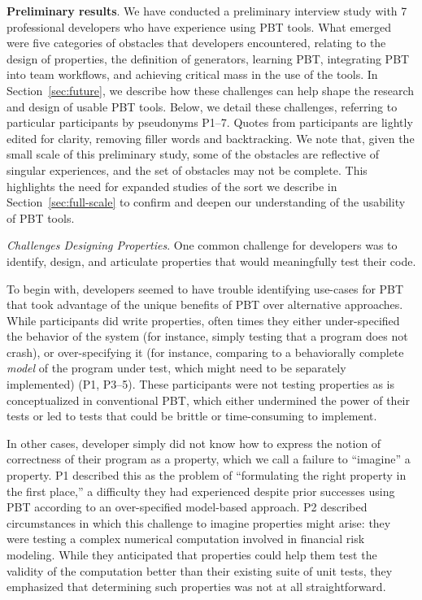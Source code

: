 \textbf{Preliminary results}.
We have conducted a preliminary interview study with 7 professional developers
who have experience using PBT tools.
What emerged were five categories of obstacles that developers encountered,
relating
to the design of properties, the definition of generators, learning PBT,
integrating PBT into team workflows, and achieving critical mass in the use of the tools.
In Section~\ref{sec:future}, we describe how these challenges
can help shape the research and design of usable PBT tools.
Below, we detail these challenges, referring to particular participants by
pseudonyms P1--7. Quotes from participants are lightly edited for clarity,
removing filler words and backtracking.
We note that, given the small scale of this preliminary study, some
of the obstacles are reflective of singular experiences, and the set of
obstacles may not be complete. This
highlights the need for expanded
studies of the sort we describe in Section~\ref{sec:full-scale} to confirm
and deepen our understanding of the usability of PBT tools.

\textit{Challenges Designing Properties}.
One common challenge for developers was to identify, design,
and articulate properties that would meaningfully test their code.

To begin with, developers seemed to have trouble identifying use-cases for PBT
that took advantage of the unique benefits of PBT over alternative approaches. While participants
did write properties, often times they either under-specified the
behavior of the system (for instance, simply testing that a program does not crash),
or over-specifying it (for instance, comparing to a behaviorally complete
{\em model} of the program under test, which might need to be separately
implemented) (P1, P3--5).
These participants were not testing properties as is conceptualized
in conventional PBT, which either undermined the power of their tests or
led to tests that could be brittle or time-consuming to implement.

In other cases, developer simply did not know how to express the notion of
correctness of their program as a property, which we call a failure
to ``imagine'' a property.
P1 described this as the problem of ``formulating the right property in the first place,''
a difficulty they had experienced despite prior successes using PBT according to
an over-specified model-based approach. P2 described circumstances in which this
challenge to imagine properties might arise: they were testing a complex numerical
computation involved in financial risk modeling. While they anticipated that
properties could help them test the validity of the computation better than their
existing suite of unit tests, they emphasized that determining such properties
was not at all straightforward.

